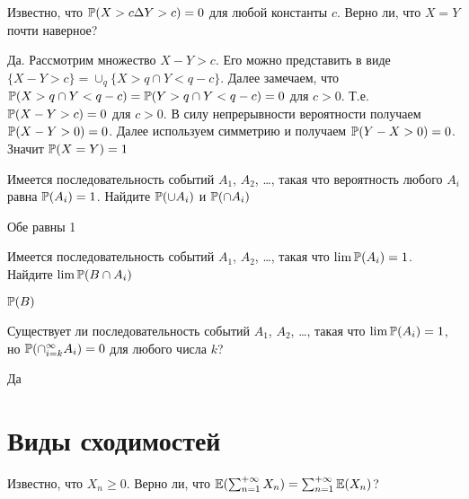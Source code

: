 \begin{problem}
Известно, что $ \P(X>c \Delta Y>c)=0 $ для любой константы $ c $. Верно ли, что $X=Y$ почти наверное?

\begin{sol}
Да. Рассмотрим множество $ X-Y>c $. Его можно представить в виде $ \{X-Y>c\}=\cup_{q} \{ X>q \cap Y<q-c\} $. Далее замечаем, что $ \P(X>q \cap Y<q-c)=\P(Y>q \cap Y<q-c)=0 $ для $ c>0 $. Т.е. $ \P(X-Y>c)=0 $ для $ c>0 $. В силу непрерывности вероятности получаем $ \P(X-Y>0)=0 $. Далее используем симметрию и получаем $ \P(Y-X>0)=0 $. Значит $ \P(X=Y)=1 $
\end{sol}
\end{problem}

\begin{problem}
Имеется последовательность событий $A_1$, $A_2$, \ldots, такая что вероятность любого $A_i$ равна $\P(A_i)=1$. Найдите $\P(\cup A_i)$ и $\P(\cap A_i)$

\begin{sol}
Обе равны 1
\end{sol}
\end{problem}

\begin{problem}
Имеется последовательность событий $A_1$, $A_2$, \ldots, такая что $\lim \P(A_i)=1$. Найдите $\lim \P(B\cap A_i)$

\begin{sol}
$\P(B)$
\end{sol}
\end{problem}

\begin{problem}
Существует ли последовательность событий $A_1$, $A_2$, \ldots, такая что $\lim \P(A_i)=1$, но $\P(\cap_{i=k}^{\infty} A_i)=0$ для любого числа $k$?

\begin{sol}
Да
\end{sol}
\end{problem}


\section{Виды сходимостей}

\begin{problem}
Известно, что $X_{n} \ge 0$. Верно ли, что
$\E(\sum_{n=1}^{+\infty}X_{n})=\sum_{n=1}^{+\infty}\E(X_{n})$?

\begin{sol}

\end{sol}
\end{problem}

